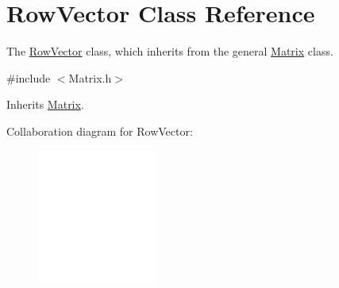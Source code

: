 \hypertarget{class_row_vector}{
\section{RowVector Class Reference}
\label{class_row_vector}
}


The \hyperlink{class_row_vector}{RowVector} class, which inherits from the general \hyperlink{class_matrix}{Matrix} class.  




{\ttfamily \#include $<$Matrix.h$>$}



Inherits \hyperlink{class_matrix}{Matrix}.



Collaboration diagram for RowVector:\nopagebreak
\begin{figure}[H]
\begin{center}
\leavevmode
\includegraphics[width=110pt]{class_row_vector__coll__graph}
\end{center}
\end{figure}
